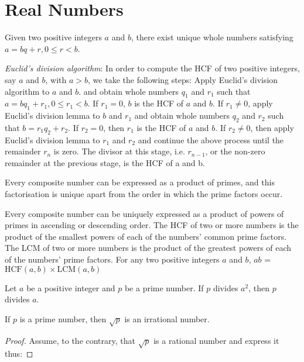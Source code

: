 \chapter{Real Numbers}

\begin{outline}
    \1 \myvspace 
    \begin{theorem}
        Given two positive integers $a$ and $b$, there exist unique whole numbers satisfying $a = bq + r, 0 \le r < b$.
    \end{theorem}
    \1 \textit{Euclid's division algorithm}: In order to compute the HCF of two positive integers, say $a$ and $b$, with $a > b$, we take the following steps:
    \2 Apply Euclid's division algorithm to $a$ and $b$. and obtain whole numbers $q_1$ and $r_1$ such that $a = bq_1 + r_1, 0 \le r_1 < b$.
    \2 If $r_1 = 0$, $b$ is the HCF of $a$ and $b$.
    \2 If $r_1 \ne 0$, apply Euclid's division lemma to $b$ and $r_1$ and obtain whole numbers $q_2$ and $r_2$ such that $b = r_1q_2 + r_2$.
    \2 If $r_2 = 0$, then $r_1$ is the HCF of $a$ and $b$.
    \2 If $r_2 \ne 0$, then apply Euclid's division lemma to $r_1$ and $r_2$ and continue the above process until the remainder $r_n$ is zero. The divisor at this stage, i.e. $r_{n - 1}$, or the non-zero remainder at the previous stage, is the HCF of a and b. \vfill
    \1 \myvspace
    \begin{theorem}
        Every composite number can be expressed as a product of primes, and this factorisation is unique apart from the order in which the prime factors occur.
    \end{theorem}
    \1 Every composite number can be uniquely expressed as a product of powers of primes in ascending or descending order.
    \1 The HCF of two or more numbers is the product of the smallest powers of each of the numbers' common prime factors.
    \1 The LCM of two or more numbers is the product of the greatest powers of each of the numbers' prime factors.
    \1 For any two positive integers $a$ and $b$, $ab$ = $\text{HCF}(a, b) \times \text{LCM}(a, b)$ \newpage
    \1 \myvspace 
    \begin{theorem}
        Let $a$ be a positive integer and $p$ be a prime number. If $p$ divides $a^2$, then $p$ divides $a$. \label{thm:prime}
    \end{theorem}
    \1 If $p$ is a prime number, then $\sqrt{p}$ is an irrational number.
    \begin{proof}
        Assume, to the contrary, that $\sqrt{p}$ is a rational number and express it thus:

\end{proof}
\end{outline}
